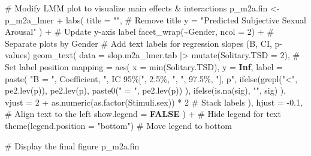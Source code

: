 \documentclass[
  bookmarksnumbered]{article}
\newenvironment{Shaded}{\begin{snugshade}}{\end{snugshade}}
\newcommand{\AttributeTok}[1]{\textcolor[rgb]{0.80,0.80,0.80}{#1}}
\newcommand{\CommentTok}[1]{\textcolor[rgb]{0.50,0.62,0.50}{#1}}
\newcommand{\ConstantTok}[1]{\textcolor[rgb]{0.86,0.64,0.64}{\textbf{#1}}}
\newcommand{\DecValTok}[1]{\textcolor[rgb]{0.86,0.86,0.80}{#1}}
\newcommand{\FloatTok}[1]{\textcolor[rgb]{0.75,0.75,0.82}{#1}}
\newcommand{\FunctionTok}[1]{\textcolor[rgb]{0.94,0.94,0.56}{#1}}
\newcommand{\NormalTok}[1]{\textcolor[rgb]{0.80,0.80,0.80}{#1}}
\newcommand{\OtherTok}[1]{\textcolor[rgb]{0.94,0.94,0.56}{#1}}
\newcommand{\SpecialCharTok}[1]{\textcolor[rgb]{0.86,0.64,0.64}{#1}}
\newcommand{\StringTok}[1]{\textcolor[rgb]{0.80,0.58,0.58}{#1}}
\begin{document}
\begin{Shaded}
\begin{Highlighting}[]
\CommentTok{\# Modify LMM plot to visualize main effects \& interactions}
\NormalTok{p\_m2a.fin }\OtherTok{\textless{}{-}}\NormalTok{ p\_m2a\_lmer }\SpecialCharTok{+}
  \FunctionTok{labs}\NormalTok{(}
    \AttributeTok{title =} \StringTok{""}\NormalTok{, }\CommentTok{\# Remove title}
    \AttributeTok{y =} \StringTok{"Predicted Subjective Sexual Arousal"}
\NormalTok{  ) }\SpecialCharTok{+} \CommentTok{\# Update y{-}axis label}
  \FunctionTok{facet\_wrap}\NormalTok{(}\SpecialCharTok{\textasciitilde{}}\NormalTok{Gender, }\AttributeTok{ncol =} \DecValTok{2}\NormalTok{) }\SpecialCharTok{+} \CommentTok{\# Separate plots by Gender}
  \CommentTok{\# Add text labels for regression slopes (B, CI, p{-}values)}
  \FunctionTok{geom\_text}\NormalTok{(}
    \AttributeTok{data =}\NormalTok{ slop.m2a\_lmer.tab }\SpecialCharTok{|\textgreater{}}
      \FunctionTok{mutate}\NormalTok{(}\AttributeTok{Solitary.TSD =} \DecValTok{2}\NormalTok{), }\CommentTok{\# Set label position}
    \AttributeTok{mapping =} \FunctionTok{aes}\NormalTok{(}
      \AttributeTok{x =} \FunctionTok{min}\NormalTok{(Solitary.TSD), }\AttributeTok{y =} \ConstantTok{Inf}\NormalTok{,}
      \AttributeTok{label =} \FunctionTok{paste}\NormalTok{(}
        \StringTok{"B = "}\NormalTok{, Coefficient,}
        \StringTok{", IC 95\%["}\NormalTok{, }\StringTok{\textasciigrave{}}\AttributeTok{2.5\%}\StringTok{\textasciigrave{}}\NormalTok{, }\StringTok{", "}\NormalTok{, }\StringTok{\textasciigrave{}}\AttributeTok{97.5\%}\StringTok{\textasciigrave{}}\NormalTok{, }\StringTok{"], p"}\NormalTok{,}
        \FunctionTok{ifelse}\NormalTok{(}\FunctionTok{grepl}\NormalTok{(}\StringTok{"\textless{}"}\NormalTok{, }\FunctionTok{pe2.lev}\NormalTok{(p)), }\FunctionTok{pe2.lev}\NormalTok{(p),}
          \FunctionTok{paste0}\NormalTok{(}\StringTok{" = "}\NormalTok{, }\FunctionTok{pe2.lev}\NormalTok{(p))}
\NormalTok{        ),}
        \FunctionTok{ifelse}\NormalTok{(}\FunctionTok{is.na}\NormalTok{(sig), }\StringTok{""}\NormalTok{, sig)}
\NormalTok{      ),}
      \AttributeTok{vjust =} \DecValTok{2} \SpecialCharTok{+} \FunctionTok{as.numeric}\NormalTok{(}\FunctionTok{as.factor}\NormalTok{(Stimuli.sex)) }\SpecialCharTok{*} \DecValTok{2} \CommentTok{\# Stack labels}
\NormalTok{    ),}
    \AttributeTok{hjust =} \SpecialCharTok{{-}}\FloatTok{0.1}\NormalTok{, }\CommentTok{\# Align text to the left}
    \AttributeTok{show.legend =} \ConstantTok{FALSE}
\NormalTok{  ) }\SpecialCharTok{+} \CommentTok{\# Hide legend for text}
  \FunctionTok{theme}\NormalTok{(}\AttributeTok{legend.position =} \StringTok{"bottom"}\NormalTok{) }\CommentTok{\# Move legend to bottom}

\CommentTok{\# Display the final figure}
\NormalTok{p\_m2a.fin}
\end{Highlighting}
\end{Shaded}
\end{document}
